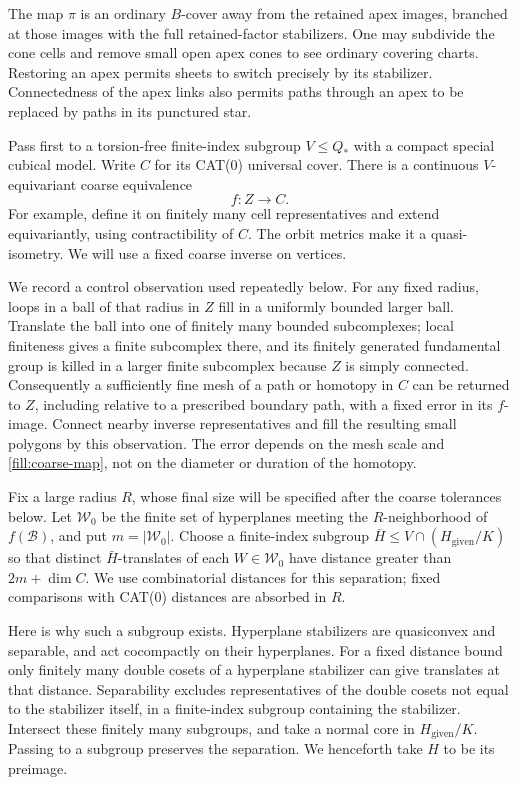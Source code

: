 The map \(\pi\) is an ordinary \(B\)-cover away from the retained apex
images, branched at those images with the full retained-factor
stabilizers.  One may subdivide the cone cells and remove small open apex
cones to see ordinary covering charts.  Restoring an apex permits sheets
to switch precisely by its stabilizer.  Connectedness of the apex links
also permits paths through an apex to be replaced by paths in its
punctured star.

Pass first to a torsion-free finite-index subgroup \(V\le Q_*\) with a
compact special cubical model.  Write \(C\) for its CAT(0) universal cover.
There is a continuous \(V\)-equivariant coarse equivalence
\begin{equation}
 f:Z\longrightarrow C.
 \label{fill:coarse-map}
\end{equation}
For example, define it on finitely many cell representatives and extend
equivariantly, using contractibility of \(C\).  The orbit metrics make it
a quasi-isometry.  We will use a fixed coarse inverse on vertices.

We record a control observation used repeatedly below.  For any fixed
radius, loops in a ball of that radius in \(Z\) fill in a uniformly
bounded larger ball.  Translate the ball into one of finitely many
bounded subcomplexes; local finiteness gives a finite subcomplex there,
and its finitely generated fundamental group is killed in a larger finite
subcomplex because \(Z\) is simply connected.  Consequently a sufficiently
fine mesh of a path or homotopy in \(C\) can be returned to \(Z\), including
relative to a prescribed boundary path, with a fixed error in its
\(f\)-image.  Connect nearby inverse representatives and fill the resulting
small polygons by this observation.  The error depends on the mesh scale
and \eqref{fill:coarse-map}, not on the diameter or duration of the
homotopy.

Fix a large radius \(R\), whose final size will be specified after the
coarse tolerances below.  Let \(\mathcal W_0\) be the finite set of
hyperplanes meeting the \(R\)-neighborhood of \(f(\mathcal B)\), and put
\(m=|\mathcal W_0|\).  Choose a finite-index subgroup
\(\bar H\le V\cap(H_{\mathrm{given}}/K)\) so that distinct
\(\bar H\)-translates of each \(W\in\mathcal W_0\) have distance greater than
\(2m+\dim C\).  We use combinatorial distances for this separation;
fixed comparisons with CAT(0) distances are absorbed in \(R\).

Here is why such a subgroup exists.  Hyperplane stabilizers are
quasiconvex and separable, and act cocompactly on their hyperplanes.
For a fixed distance bound only finitely many double cosets of a
hyperplane stabilizer can give translates at that distance.
Separability excludes representatives of the double cosets not equal to
the stabilizer itself, in a finite-index subgroup containing the
stabilizer.  Intersect these finitely many subgroups, and take a normal
core in \(H_{\mathrm{given}}/K\).  Passing to a subgroup preserves the
separation.  We henceforth take \(H\) to be its preimage.

